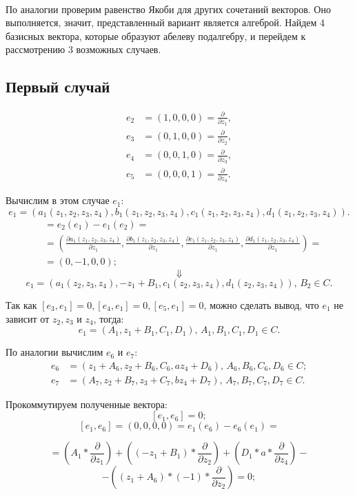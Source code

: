 \documentclass[12pt]{article}
\begin{document}
\\
По аналогии проверим равенство Якоби для других сочетаний векторов. Оно выполняется, значит, представленный вариант является алгеброй. Найдем 4 базисных вектора, которые образуют абелеву подалгебру, и перейдем к рассмотрению 3 возможных случаев. 
\\

\subsection{Первый случай}
\begin{align*}
e_2 &= (1,0,0,0) = \frac{\partial}{\partial z_1}, \\
e_3 &= (0,1,0,0) = \frac{\partial}{\partial z_2}, \\
e_4 &= (0,0,1,0) = \frac{\partial}{\partial z_3}, \\
e_5 &= (0,0,0,1) = \frac{\partial}{\partial z_4}. 
\end{align*}

Вычислим в этом случае $e_1$:
$$e_1 = (a_1(z_1,z_2,z_3,z_4), b_1(z_1,z_2,z_3,z_4), c_1(z_1,z_2,z_3,z_4), d_1(z_1,z_2,z_3,z_4)).$$ 
\begin{align*}
[e_2,e_1] &= e_2(e_1) - e_1(e_2) = \\
&= \left(
\frac{\partial a_1(z_1,z_2,z_3,z_4)}{\partial z_1}, 
\frac{\partial b_1(z_1,z_2,z_3,z_4)}{\partial z_1}, 
\frac{\partial c_1(z_1,z_2,z_3,z_4)}{\partial z_1},
\frac{\partial d_1(z_1,z_2,z_3,z_4)}{\partial z_1}
\right) = \\
& = (0,-1,0,0);
\end{align*}
$$\Downarrow$$
$$e_1 = (a_1(z_2,z_3,z_4), -z_1 + B_1, c_1(z_2,z_3,z_4), d_1(z_2,z_3,z_4)), \, B_2 \in C.$$

Так как $[e_3,e_1] = 0, [e_4,e_1] = 0, [e_5,e_1] = 0$, можно сделать вывод, что $e_1$ не зависит от $z_2, z_3 \text{ и } z_4$, тогда: 
$$e_1 = (A_1, z_1 + B_1, C_1, D_1), \, A_1, B_1, C_1, D_1 \in C.$$ 

По аналогии вычислим $e_6 \text{ и } e_7$:
\begin{align*}
e_6 &= (z_1 + A_6, z_2 + B_6, C_6, az_4 + D_6), \, A_6, B_6, C_6, D_6 \in C; \\
e_7 &= (A_7, z_2 + B_7, z_3 + C_7, bz_4 + D_7), \, A_7, B_7, C_7, D_7 \in C.
\end{align*}

Прокоммутируем полученные вектора:
\[
[e_1, e_6] = 0;
\]
\[
[e_1, e_6] = (0, 0, 0, 0) = e_1(e_6) - e_6(e_1) = 
\]

\[
= \left(A_1 * \frac{\partial}{\partial z_1}\right)
+ \left((-z_1 + B_1) * \frac{\partial}{\partial z_2}\right)
+ \left(D_1 * a * \frac{\partial}{\partial z_4}\right) -
\]
\[
- \left((z_1 + A_6) * (-1) * \frac{\partial}{\partial z_2}\right) = 0;
\]
\end{document}
